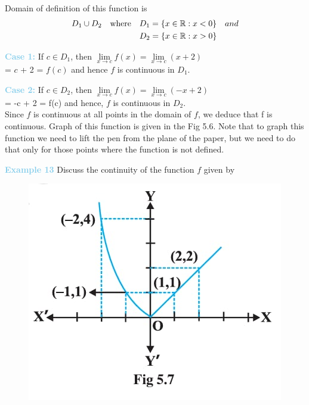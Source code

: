 \documentclass[a4paper,12pt]{article}
\begin{document}
\noindent Domain of definition of this function is
\[
\hspace{0cm}
\begin{aligned}
    D_1 \cup D_2 & \quad \text{where} \quad D_1 = \{x \in \mathbb{R} : x < 0\} \quad and  \\
                 & \quad \quad \quad \quad \hspace{2mm} D_2 = \{x \in \mathbb{R} : x > 0\}
\end{aligned}
\]

\noindent \textbf{\textcolor{skyblue}{Case 1:}} If $c \in D_1$, then  
$\lim\limits_{x \to c} f(x) = \lim\limits_{x \to c} (x+2)$ \\
\vspace{4pt}
\noindent = $c$ + 2 = $f(c)$ and hence $f$ is continuous in $D_1$.

\vspace{4pt}
\noindent \textbf{\textcolor{skyblue}{Case 2:}} If $c \in D_2$, then
$\lim\limits_{x \to c} f(x) = \lim\limits_{x \to c} (-x + 2)$ \\
\vspace{4pt}
= -c + 2 = f(c) and hence, $f$ is continuous in $D_2$.\\ Since $f$ is continuous at all points in the domain of $f$,  we deduce that f is continuous. Graph of this
 function is given in the Fig 5.6. Note that to graph
 this function we need to lift the pen from the plane
 of the paper, but we need to do that only for those points where the function is not
 defined.

\vspace{10pt} %

\noindent \textbf{\textcolor{skyblue}{Example 13}} Discuss the continuity of the function $f$ given by

\begin{figure}
    \centering
    \includegraphics[width=1\linewidth]{d.jpg}
    \vspace{-1cm}
\end{figure}
\hspace{-3cm}
\end{document}
